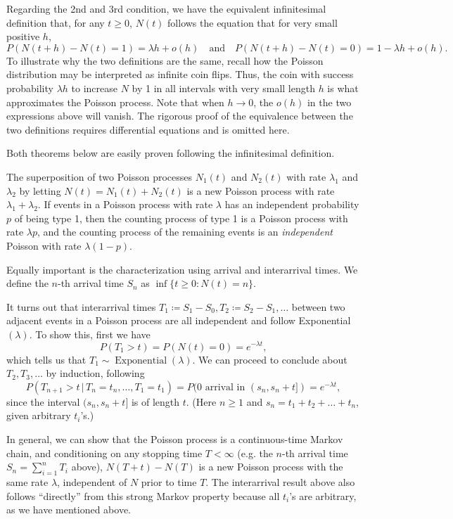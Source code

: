 \documentclass[11pt]{article}
\newcommand{\where}{\,|\,}
\begin{document}
Regarding the 2nd and 3rd condition, we have the equivalent infinitesimal definition that, for any $t\geq 0$, $N(t)$ follows the equation that for very small positive $h$, \[P(N(t+h)- N(t)=1)=\lambda h+o(h) \quad \text{and} \quad  P(N(t+h)- N(t)=0)=1- \lambda h+o(h).\]
To illustrate why the two definitions are the same, recall how the Poisson distribution may be interpreted as infinite coin flips. Thus, the coin with success probability $\lambda h$ to increase $N$ by 1 in all intervals with very small length $h$ is what approximates the Poisson process. Note that when $h\rightarrow 0$, the $o(h)$ in the two expressions above will vanish. The rigorous proof of the equivalence between the two definitions requires differential equations and is omitted here.

Both theorems below are easily proven following the infinitesimal definition. 

The superposition of two Poisson processes $N_{1}(t)$ and $N_{2}(t)$ with rate $\lambda _{1}$ and $\lambda _{2}$ by letting $N(t)=N_{1}(t)+N_{2}(t)$ is a new Poisson process with rate $\lambda _{1}+\lambda _{2}$. If events in a Poisson process with rate $\lambda $ has an independent probability $p$ of being type 1, then the counting process of type 1 is a Poisson process with rate $\lambda p$, and the counting process of the remaining events is an \emph{independent} Poisson with rate $\lambda (1- p)$.

Equally important is the characterization using arrival and interarrival times. We define the $n$-th arrival time $S_{n}$ as $\inf \{t\geq 0 : N(t)=n\}$.

It turns out that interarrival times $T_{1}\coloneqq S_{1}- S_{0},T_{2}\coloneqq S_{2}- S_{1},\dots $ between two adjacent events in a Poisson process are all independent and follow Exponential$(\lambda)$. To show this, first we have
\[
P(T_{1}>t)=P(N(t)=0)=e^{- \lambda t},
\]
which tells us that $T_{1}\sim \operatorname{Exponential}(\lambda)$. We can proceed to conclude about $T_{2},T_{3},\dots $ by induction, following
\[
P(T_{n+1}>t \where T_{n}=t_{n},\dots ,T_{1}=t_{1})=P(\text{0 arrival in } (s_{n},s_{n}+t])=e^{- \lambda t},
\]
since the interval $(s_{n},s_{n}+t]$ is of length $t$. (Here $n\geq 1$ and $s_{n}=t_{1}+t_{2}+\dots +t_{n}$, given arbitrary $t_{i}$’s.)

In general, we can show that the Poisson process is a continuous-time Markov chain, and conditioning on any stopping time $T<\infty $ (e.g. the $n$-th arrival time $S_{n}=\sum_{i=1}^{n}T_{i}$ above), $N(T+t)- N(T)$ is a new Poisson process with the same rate $\lambda$, independent of $N$ prior to time $T$. The interarrival result above also follows “directly” from this strong Markov property because all $t_{i}$’s are arbitrary, as we have mentioned above.
\end{document}

